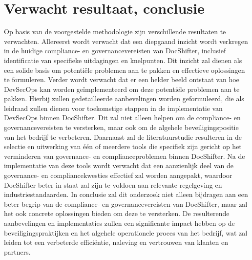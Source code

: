 \documentclass{hogent-article}
\begin{document}
    
    \section{Verwacht resultaat, conclusie}%
    \label{sec:verwachte_resultaten}
    Op basis van de voorgestelde methodologie zijn verschillende resultaten te verwachten. Allereerst wordt verwacht dat een diepgaand inzicht wordt verkregen in de huidige compliance- en governancevereisten van DocShifter, inclusief identificatie van specifieke uitdagingen en knelpunten. Dit inzicht zal dienen als een solide basis om potentiële problemen aan te pakken en effectieve oplossingen te formuleren.
    Verder wordt verwacht dat er een helder beeld ontstaat van hoe DevSecOps kan worden geïmplementeerd om deze potentiële problemen aan te pakken. Hierbij zullen gedetailleerde aanbevelingen worden geformuleerd, die als leidraad zullen dienen voor toekomstige stappen in de implementatie van DevSecOps binnen DocShifter. Dit zal niet alleen helpen om de compliance- en governancevereisten te versterken, maar ook om de algehele beveiligingspositie van het bedrijf te verbeteren.
    Daarnaast zal de literatuurstudie resulteren in de selectie en uitwerking van één of meerdere tools die specifiek zijn gericht op het verminderen van governance- en complianceproblemen binnen DocShifter. Na de implementatie van deze tools wordt verwacht dat een aanzienlijk deel van de governance- en compliancekwesties effectief zal worden aangepakt, waardoor DocShifter beter in staat zal zijn te voldoen aan relevante regelgeving en industriestandaarden.
    In conclusie zal dit onderzoek niet alleen bijdragen aan een beter begrip van de compliance- en governancevereisten van DocShifter, maar zal het ook concrete oplossingen bieden om deze te versterken. De resulterende aanbevelingen en implementaties zullen een significante impact hebben op de beveiligingspraktijken en het algehele operationele proces van het bedrijf, wat zal leiden tot een verbeterde efficiëntie, naleving en vertrouwen van klanten en partners.
         
    
    \printbibliography[heading=bibintoc]
    
\end{document}
